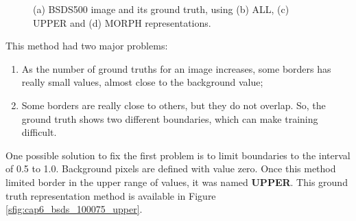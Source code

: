 \begin{figure}%
  \centering
  \hfill
  \hfill
  \hfill
  \caption{(a) BSDS500 image and its ground truth, using (b) ALL, (c) UPPER and (d) MORPH representations.}
  \label{fig:cap6_bsds_all}
\end{figure}

This method had two major problems:

\begin{enumerate}
    \item As the number of ground truths for an image increases, some borders has really small values, almost close to the background value;
    \item Some borders are really close to others, but they do not overlap. So, the ground truth shows two different boundaries, which can make training difficult.
\end{enumerate}

One possible solution to fix the first problem is to limit boundaries to the interval of 0.5 to 1.0.
Background pixels are defined with value zero.
Once this method limited border in the upper range of values, it was named \textbf{UPPER}.
This ground truth representation method is available in Figure \ref{sfig:cap6_bsds_100075_upper}.

